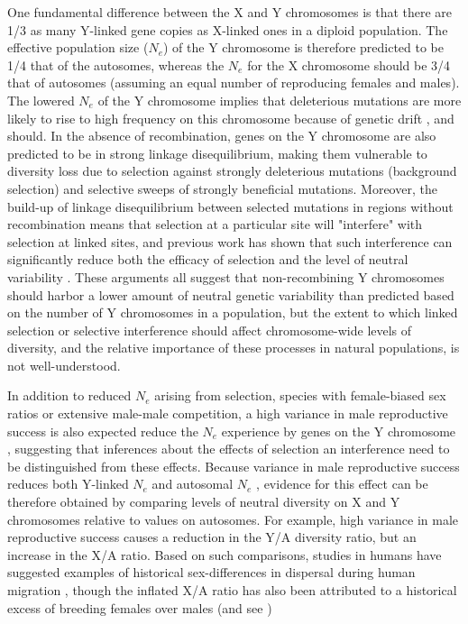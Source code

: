 \documentclass[9pt,twocolumn,twoside]{gsajnl}
\begin{document}
One fundamental difference between the X and Y chromosomes is that there are 1/3 as many Y-linked gene copies as X-linked ones in a diploid population. The effective population size ($N_{e}$) of the Y chromosome is therefore predicted to be 1/4 that of the autosomes, whereas the $N_{e}$ for the X chromosome should be 3/4 that of autosomes (assuming an equal number of reproducing females and males). The lowered $N_{e}$ of the Y chromosome implies that  deleterious mutations are more likely to rise to high frequency on this chromosome because of genetic drift \citep{nei1981genetic}, and should. In the absence of recombination, genes on the Y chromosome are also predicted to be in strong linkage disequilibrium, making them vulnerable to diversity loss due to selection against strongly deleterious mutations (background selection) and selective sweeps of strongly beneficial mutations. Moreover, the build-up of linkage disequilibrium between selected mutations in regions without recombination means that selection at a particular site will "interfere" with selection at linked sites, and previous work has shown that such interference can significantly reduce both the efficacy of selection and the level of neutral variability \citep{fisher1930genetical, muller1964relation, hill1966HReffect, mcvean2000}. These arguments all suggest that non-recombining Y chromosomes should harbor a lower amount of neutral genetic variability than predicted based on the number of Y chromosomes in a population, but the extent to which linked selection or selective interference should affect chromosome-wide levels of diversity, and the relative importance of these processes in natural populations, is not well-understood.

In addition to reduced $N_{e}$ arising from selection, species with female-biased sex ratios or extensive male-male competition, a high variance in male reproductive success is also expected reduce the $N_{e}$ experience by genes on the Y chromosome \citep{caballero1995,charlesworth2001,laporte2002,pool2007,ellegren2009}, suggesting that inferences about the effects of selection an interference need to be distinguished from these effects. Because variance in male reproductive success reduces both Y-linked $N_{e}$ and autosomal $N_{e}$ \citep{kimura1964number,nomura2002effective}, evidence for this effect can be therefore obtained by comparing levels of neutral diversity on X and Y chromosomes relative to values on autosomes. For example, high variance in male reproductive success causes a reduction in the Y/A diversity ratio, but an increase in the X/A ratio. Based on such comparisons, studies in humans have suggested examples of historical sex-differences in dispersal during human migration \citep{wilkins2006unraveling}, though the inflated X/A ratio has also been attributed to a historical excess of breeding females over males \citep{hammer2008sex} (and see \citep{bustamante2009,hammer2010,cotter2016genetic})
\end{document}
